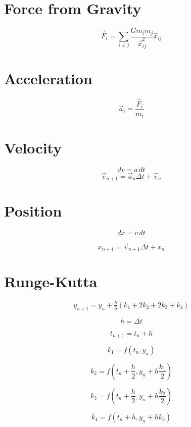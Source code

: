 \documentclass[10pt,a4paper,notitlepage]{report}
\begin{document}
\section{Force from Gravity}
\begin{equation}
\vec{F}_i = \sum_{i \neq j} \frac{G m_i m_j}{\vec{x}_{ij}^2} \hat{x}_{ij}
\end{equation}

\section{Acceleration}
\begin{equation}
\vec{a}_i = \frac{\vec{F}_i}{m_i}
\end{equation}

\section{Velocity}
\begin{equation}
dv = a \, dt
\end{equation}
\begin{equation}
\vec{v}_{n+1} = \vec{a}_n \Delta t + \vec{v}_n
\end{equation}

\section{Position}
\begin{equation}
dx = v \, dt
\end{equation}

\begin{equation}
x_{n+1} = \vec{v}_{n+1} \Delta t + x_n
\end{equation}

\section{Runge-Kutta}
\begin{equation}
y_{n+1} = y_n + \tfrac{h}{6}\left(k_1 + 2k_2 + 2k_3 + k_4 \right)
\end{equation}

\begin{equation}
h = \Delta t
\end{equation}

\begin{equation}
t_{n+1} = t_n + h 
\end{equation}

\begin{equation}
k_1 = f(t_n, y_n)
\end{equation}

\begin{equation}
k_2 = f\left(t_n + \frac{h}{2}, y_n + h\frac{k_1}{2}\right)
\end{equation}

\begin{equation}
k_3 = f\left(t_n + \frac{h}{2}, y_n + h\frac{k_2}{2}\right)
\end{equation}

\begin{equation}
k_4 = f\left(t_n + h, y_n + hk_3\right)
\end{equation}
\end{document}
